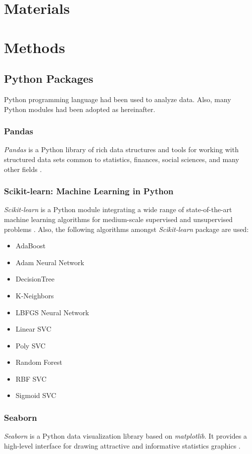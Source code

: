 \documentclass[aps, 11pt, a4paper]{article}
\begin{document}
    \section{Materials}
    
    \section{Methods}
    	\subsection{Python Packages}
    		Python programming language had been used to analyze data. Also, many Python modules had been adopted as hereinafter.
    		
    		\subsubsection{Pandas}
    		\textit{Pandas} is a Python library of rich data structures and tools for working with structured data sets common to statistics, finances, social sciences, and many other fields \cite{ref:pandas1}.
    		
    		\subsubsection{Scikit-learn: Machine Learning in Python}
    			\textit{Scikit-learn} is a Python module integrating a wide range of state-of-the-art machine learning algorithms for medium-scale supervised and unsupervised problems \cite{ref:sklearn1}. Also, the following algorithms amongst \textit{Scikit-learn} package are used:
    			\begin{itemize}
					\item AdaBoost
					\item Adam Neural Network
					\item DecisionTree
					\item K-Neighbors
					\item LBFGS Neural Network
					\item Linear SVC
					\item Poly SVC
					\item Random Forest
					\item RBF SVC
					\item Sigmoid SVC
    			\end{itemize}
    			    			
    		\subsubsection{Seaborn}
		   		\textit{Seaborn} is a Python data visualization library based on \textit{matplotlib}. It provides a high-level interface for drawing attractive and informative statistics graphics \cite{ref:seaborn1}.
\end{document}
